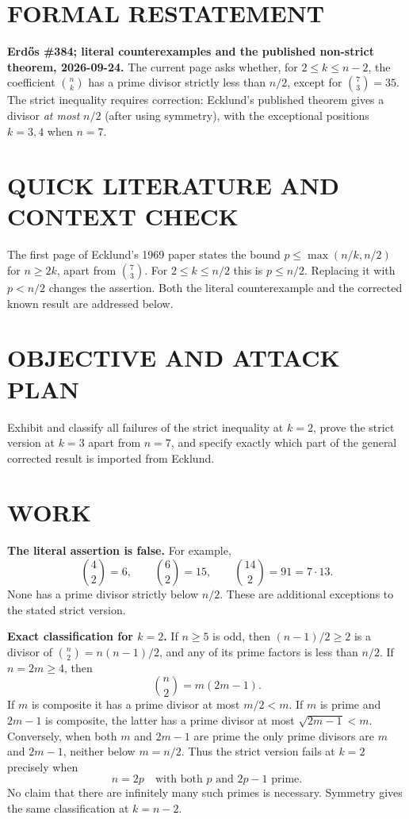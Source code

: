 \section{FORMAL RESTATEMENT}
\textbf{Erd\H{o}s \#384; literal counterexamples and the published non-strict theorem, 2026-09-24.}
The current page asks whether, for $2\leq k\leq n-2$, the coefficient $\binom nk$ has a prime divisor strictly less than $n/2$, except for $\binom73=35$. The strict inequality requires correction: Ecklund's published theorem gives a divisor \emph{at most} $n/2$ (after using symmetry), with the exceptional positions $k=3,4$ when $n=7$.

\section{QUICK LITERATURE AND CONTEXT CHECK}
The first page of Ecklund's 1969 paper states the bound $p\leq\max(n/k,n/2)$ for $n\geq2k$, apart from $\binom73$. For $2\leq k\leq n/2$ this is $p\leq n/2$. Replacing it with $p<n/2$ changes the assertion. Both the literal counterexample and the corrected known result are addressed below.

\section{OBJECTIVE AND ATTACK PLAN}
Exhibit and classify all failures of the strict inequality at $k=2$, prove the strict version at $k=3$ apart from $n=7$, and specify exactly which part of the general corrected result is imported from Ecklund.

\section{WORK}
\textbf{The literal assertion is false.} For example,
\[
\binom42=6,\qquad\binom62=15,\qquad\binom{14}2=91=7\cdot13.
\]
None has a prime divisor strictly below $n/2$. These are additional exceptions to the stated strict version.

\textbf{Exact classification for $k=2$.} If $n\geq5$ is odd, then $(n-1)/2\geq2$ is a divisor of $\binom n2=n(n-1)/2$, and any of its prime factors is less than $n/2$. If $n=2m\geq4$, then
\[
\binom n2=m(2m-1).
\]
If $m$ is composite it has a prime divisor at most $m/2<m$. If $m$ is prime and $2m-1$ is composite, the latter has a prime divisor at most $\sqrt{2m-1}<m$. Conversely, when both $m$ and $2m-1$ are prime the only prime divisors are $m$ and $2m-1$, neither below $m=n/2$. Thus the strict version fails at $k=2$ precisely when
\[
n=2p\quad\text{with both }p\text{ and }2p-1\text{ prime}.       \tag{1}
\]
No claim that there are infinitely many such primes is necessary. Symmetry gives the same classification at $k=n-2$.

